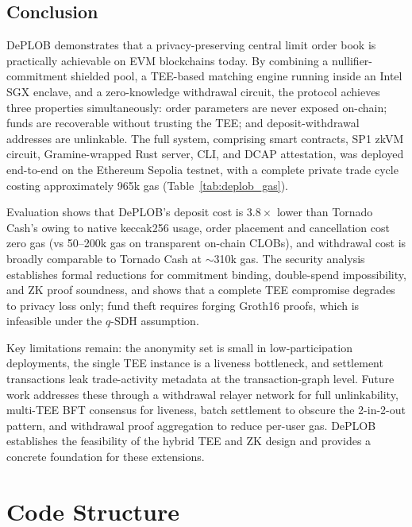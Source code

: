 \documentclass[12pt,a4paper]{article}
\begin{document}
\subsection{Conclusion}

DePLOB demonstrates that a privacy-preserving central limit order book is practically achievable on EVM blockchains today. By combining a nullifier-commitment shielded pool, a TEE-based matching engine running inside an Intel SGX enclave, and a zero-knowledge withdrawal circuit, the protocol achieves three properties simultaneously: order parameters are never exposed on-chain; funds are recoverable without trusting the TEE; and deposit-withdrawal addresses are unlinkable. The full system, comprising smart contracts, SP1 zkVM circuit, Gramine-wrapped Rust server, CLI, and DCAP attestation, was deployed end-to-end on the Ethereum Sepolia testnet, with a complete private trade cycle costing approximately 965k gas (Table~\ref{tab:deplob_gas}).

Evaluation shows that DePLOB's deposit cost is $3.8\times$ lower than Tornado Cash's owing to native keccak256 usage, order placement and cancellation cost zero gas (vs 50--200k gas on transparent on-chain CLOBs), and withdrawal cost is broadly comparable to Tornado Cash at ${\sim}$310k gas. The security analysis establishes formal reductions for commitment binding, double-spend impossibility, and ZK proof soundness, and shows that a complete TEE compromise degrades to privacy loss only; fund theft requires forging Groth16 proofs, which is infeasible under the $q$-SDH assumption.

Key limitations remain: the anonymity set is small in low-participation deployments, the single TEE instance is a liveness bottleneck, and settlement transactions leak trade-activity metadata at the transaction-graph level. Future work addresses these through a withdrawal relayer network for full unlinkability, multi-TEE BFT consensus for liveness, batch settlement to obscure the 2-in-2-out pattern, and withdrawal proof aggregation to reduce per-user gas. DePLOB establishes the feasibility of the hybrid TEE and ZK design and provides a concrete foundation for these extensions.

\nocite{*}
\printbibliography

\appendix

\section{Code Structure}
\label{app:code}
\end{document}
